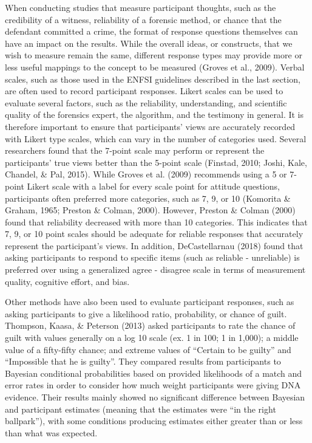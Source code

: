 \documentclass[print]{nuthesis}
\begin{document}
When conducting studies that measure participant thoughts, such as the credibility of a witness, reliability of a forensic method, or chance that the defendant committed a crime, the format of response questions themselves can have an impact on the results.
While the overall ideas, or constructs, that we wish to measure remain the same, different response types may provide more or less useful mappings to the concept to be measured (Groves et al., 2009).
Verbal scales, such as those used in the ENFSI guidelines described in the last section, are often used to record participant responses.
Likert scales can be used to evaluate several factors, such as the reliability, understanding, and scientific quality of the forensics expert, the algorithm, and the testimony in general.
It is therefore important to ensure that participants' views are accurately recorded with Likert type scales, which can vary in the number of categories used.
Several researchers found that the 7-point scale may perform or represent the participants' true views better than the 5-point scale (Finstad, 2010; Joshi, Kale, Chandel, \& Pal, 2015).
While Groves et al. (2009) recommends using a 5 or 7-point Likert scale with a label for every scale point for attitude questions, participants often preferred more categories, such as 7, 9, or 10 (Komorita \& Graham, 1965; Preston \& Colman, 2000).
However, Preston \& Colman (2000) found that reliability decreased with more than 10 categories.
This indicates that 7, 9, or 10 point scales should be adequate for reliable responses that accurately represent the participant's views.
In addition, DeCastellarnau (2018) found that asking participants to respond to specific items (such as reliable - unreliable) is preferred over using a generalized agree - disagree scale in terms of measurement quality, cognitive effort, and bias.

Other methods have also been used to evaluate participant responses, such as asking participants to give a likelihood ratio, probability, or chance of guilt.
Thompson, Kaasa, \& Peterson (2013) asked participants to rate the chance of guilt with values generally on a log 10 scale (ex. 1 in 100; 1 in 1,000); a middle value of a fifty-fifty chance; and extreme values of ``Certain to be guilty'' and ``Impossible that he is guilty''.
They compared results from participants to Bayesian conditional probabilities based on provided likelihoods of a match and error rates in order to consider how much weight participants were giving DNA evidence.
Their results mainly showed no significant difference between Bayesian and participant estimates (meaning that the estimates were ``in the right ballpark''), with some conditions producing estimates either greater than or less than what was expected.
\end{document}
